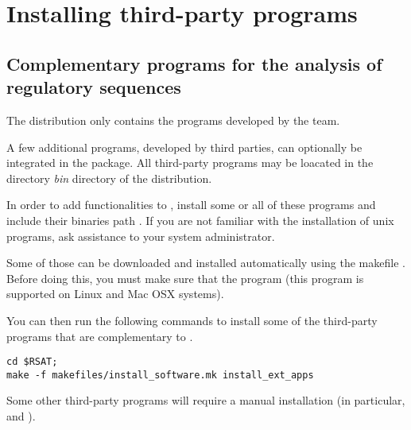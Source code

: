 \documentclass[12pt,a4paper, oneside]{scrreprt} %
\begin{document}



\chapter{Installing third-party programs}

\section{Complementary programs for the analysis of regulatory
  sequences}

The \RSAT distribution only contains the programs developed by the
\RSAT team.

A few additional programs, developed by third parties, can optionally
be integrated in the package. All third-party programs may be loacated
in the directory \emph{bin} directory of the \RSAT distribution.  

In order to add functionalities to \RSAT, install some or all of these
programs and include their binaries path . If you are
not familiar with the installation of unix programs, ask assistance to
your system administrator.

Some of those can be downloaded and installed automatically using the
makefile . Before doing this, you must make
sure that the program  (this program is supported on
Linux  and Mac OSX
systems).

You can then run the following commands to install some of the
third-party programs that are complementary to \RSAT.

\begin{lstlisting}
cd $RSAT;
make -f makefiles/install_software.mk install_ext_apps
\end{lstlisting}

Some other third-party programs will require a manual installation (in
particular,  and ).
\end{document}
